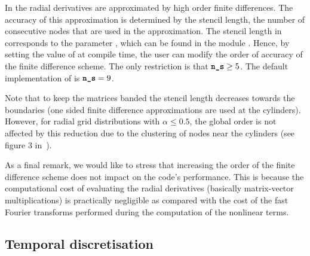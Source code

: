 \documentclass[a4paper, 11pt, DIV=11]{scrartcl}
\begin{document}
In \nsc the radial derivatives are approximated by high order finite differences.
The accuracy of this approximation is determined by the stencil length, \ie the number
of consecutive nodes that are used in the approximation. The stencil length in \nsc
corresponds to the parameter , which can be found in the module
. Hence, by setting the value of  at compile time, the
user can modify the order of accuracy of the finite difference scheme. The only
restriction is that $\textbf{\texttt{\color{black}n\_s}}\geq\num{5}$.
The default implementation of \nsc is $\textbf{\texttt{\color{black}n\_s}} = 9$.
\par
Note that to keep the matrices banded the stencil length decreases towards
the boundaries (\eg one sided finite difference approximations are used at the
cylinders). However, for radial grid distributions with $\alpha \leq \num{0.5}$,
the global order is not affected by this reduction due to the clustering of nodes
near the cylinders (see figure 3 in~\cite{Shi2015}).
\par
As a final remark, we would like to stress that increasing the order of the
finite difference scheme does not impact on the code's performance. This is
because the computational cost of evaluating the radial derivatives (basically
matrix-vector multiplications) is practically negligible as compared with the
cost of the fast Fourier transforms performed during the computation of the
nonlinear terms.

\subsection{Temporal discretisation}
\label{sec:timeStepper}
\end{document}
